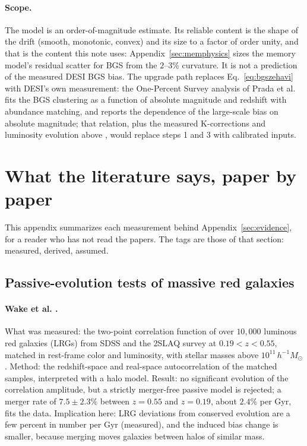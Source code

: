 \documentclass[11pt]{article}
\begin{document}
\paragraph{Scope.}
The model is an order-of-magnitude estimate.  Its reliable content
is the shape of the drift (smooth, monotonic, convex) and its size
to a factor of order unity, and that is the content this note uses:
Appendix~\ref{sec:memphysics} sizes the memory model's residual
scatter for BGS from the $2$--$3\%$ curvature.  It is not a
prediction of the measured DESI BGS bias.  The upgrade path replaces
Eq.~\eqref{eq:bgszehavi} with DESI's own measurement: the
One-Percent Survey analysis of Prada et al. \cite{Prada2023} fits
the BGS clustering as a function of absolute magnitude and redshift
with abundance matching, and reports the dependence of the
large-scale bias on absolute magnitude; that relation, plus the
measured K-corrections and luminosity evolution above
\cite{BlantonRoweis2007, Blanton2003}, would replace steps 1 and 3
with calibrated inputs.

\section{What the literature says, paper by paper}
\label{app:literature}

This appendix summarizes each measurement behind
Appendix~\ref{sec:evidence}, for a reader who has not read the papers.
The tags are those of that section: measured, derived, assumed.

\subsection{Passive-evolution tests of massive red galaxies}

\paragraph{Wake et al. \cite{Wake2008}.}
What was measured: the two-point correlation function of over
$10{,}000$ luminous red galaxies (LRGs) from SDSS and the 2SLAQ
survey at $0.19 < z < 0.55$, matched in rest-frame color and
luminosity, with stellar masses above $10^{11}\,h^{-1} M_\odot$.
Method: the redshift-space and real-space autocorrelation of the
matched samples, interpreted with a halo model.  Result: no
significant evolution of the correlation amplitude, but a strictly
merger-free passive model is rejected; a merger rate of
$7.5 \pm 2.3\%$ between $z = 0.55$ and $z = 0.19$, about $2.4\%$ per
Gyr, fits the data.  Implication here: LRG deviations from conserved
evolution are a few percent in number per Gyr (measured), and the
induced bias change is smaller, because merging moves galaxies
between halos of similar mass.
\end{document}

